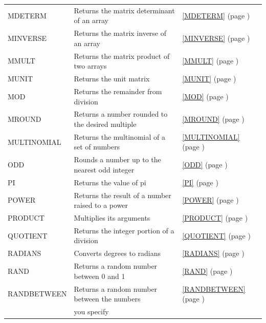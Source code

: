 \begin{center}
\begin{longtable}{l l l }
		MDETERM & Returns the matrix determinant of an array &  \ref{MDETERM} (page \pageref{MDETERM}) \index{Spreadsheet Functions!MDETERM} \\
		MINVERSE & Returns the matrix inverse of an array &  \ref{MINVERSE} (page \pageref{MINVERSE}) \index{Spreadsheet Functions!MINVERSE} \\
		MMULT & Returns the matrix product of two arrays &  \ref{MMULT} (page \pageref{MMULT}) \index{Spreadsheet Functions!MMULT} \\
		MUNIT & Returns the unit matrix &  \ref{MUNIT} (page \pageref{MUNIT}) \index{Spreadsheet Functions!MUNIT} \\
		MOD   & Returns the remainder from division &  \ref{MOD} (page \pageref{MOD}) \index{Spreadsheet Functions!MOD} \\
		MROUND & Returns a number rounded to the desired multiple &  \ref{MROUND} (page \pageref{MROUND}) \index{Spreadsheet Functions!MROUND} \\
		MULTINOMIAL & Returns the multinomial of a set of numbers &  \ref{MULTINOMIAL} (page \pageref{MULTINOMIAL}) \index{Spreadsheet Functions!MULTINOMIAL} \\
		ODD   & Rounds a number up to the nearest odd integer &  \ref{ODD} (page \pageref{ODD}) \index{Spreadsheet Functions!ODD} \\				
		PI    & Returns the value of pi &  \ref{PI} (page \pageref{PI}) \index{Spreadsheet Functions!PI} \\
		POWER & Returns the result of a number raised to a power &  \ref{POWER} (page \pageref{POWER}) \index{Spreadsheet Functions!POWER} \\
		PRODUCT & Multiplies its arguments &  \ref{PRODUCT} (page \pageref{PRODUCT}) \index{Spreadsheet Functions!PRODUCT} \\
		QUOTIENT & Returns the integer portion of a division &  \ref{QUOTIENT} (page \pageref{QUOTIENT}) \index{Spreadsheet Functions!QUOTIENT} \\
		RADIANS & Converts degrees to radians &  \ref{RADIANS} (page \pageref{RADIANS}) \index{Spreadsheet Functions!RADIANS} \\
		RAND  & Returns a random number between 0 and 1 &  \ref{RAND} (page \pageref{RAND}) \index{Spreadsheet Functions!RAND} \\				
		RANDBETWEEN & Returns a random number between the numbers  &  \ref{RANDBETWEEN} (page \pageref{RANDBETWEEN}) \index{Spreadsheet Functions!RANDBETWEEN} \\
		& you specify &   \\

\end{longtable}
\end{center}
